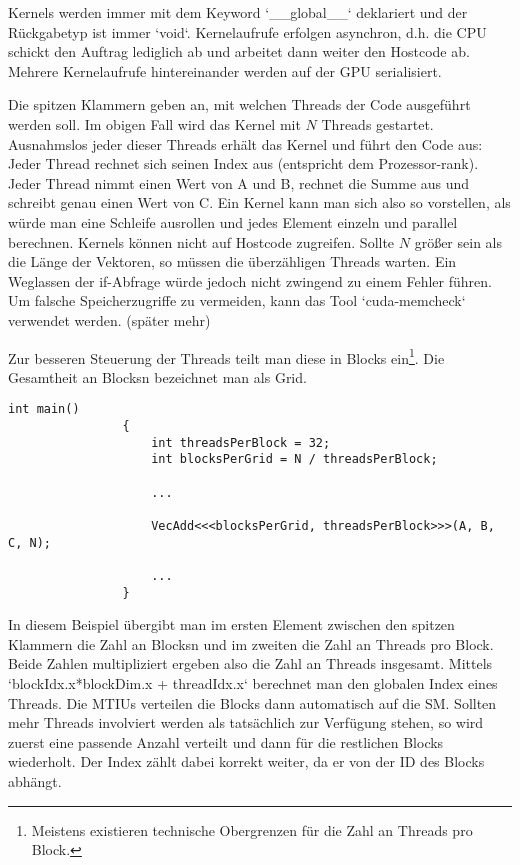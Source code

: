 			\Glspl{Kernel} werden immer mit dem Keyword \li`__global__` deklariert und der Rückgabetyp ist immer \li`void`. \Gls{Kernel}aufrufe erfolgen asynchron, d.h. die CPU schickt den Auftrag lediglich ab und arbeitet dann weiter den Hostcode ab. Mehrere \Gls{Kernel}aufrufe hintereinander werden auf der GPU serialisiert.
			
			Die spitzen Klammern geben an, mit welchen \Glspl{Thread} der Code ausgeführt werden soll. Im obigen Fall wird das \Gls{Kernel} mit $N$ \Glspl{Thread} gestartet. Ausnahmslos jeder dieser \Glspl{Thread} erhält das \Gls{Kernel} und führt den Code aus: Jeder \Gls{Thread} rechnet sich seinen Index aus (entspricht dem Prozessor-rank). Jeder \Gls{Thread} nimmt einen Wert von A und B, rechnet die Summe aus und schreibt genau einen Wert von C. Ein \Gls{Kernel} kann man sich also so vorstellen, als würde man eine Schleife ausrollen und jedes Element einzeln und parallel berechnen. \Glspl{Kernel} können nicht auf Hostcode zugreifen. Sollte $N$ größer sein als die Länge der Vektoren, so müssen die überzähligen \Glspl{Thread} warten. Ein Weglassen der if-Abfrage würde jedoch nicht zwingend zu einem Fehler führen. Um falsche Speicherzugriffe zu vermeiden, kann das Tool \li`cuda-memcheck` verwendet werden. (später mehr)
			
			Zur besseren Steuerung der \Glspl{Thread} teilt man diese in \Glspl{Block} ein\footnote{Meistens existieren technische Obergrenzen für die Zahl an Threads pro Block.}. Die Gesamtheit an \Glspl{Block}n bezeichnet man als \Gls{Grid}.
			
			\begin{lstlisting}[caption=~Kernelaufruf]		
				int main()
				{
					int threadsPerBlock = 32;
					int blocksPerGrid = N / threadsPerBlock;
					
					...
					
					VecAdd<<<blocksPerGrid, threadsPerBlock>>>(A, B, C, N);
					
					...					
				}
			\end{lstlisting}

			In diesem Beispiel übergibt man im ersten Element zwischen den spitzen Klammern die Zahl an \Glspl{Block}n und im zweiten die Zahl an \Glspl{Thread} pro \Gls{Block}. Beide Zahlen multipliziert ergeben also die Zahl an \Glspl{Thread} insgesamt. Mittels \li`blockIdx.x*blockDim.x + threadIdx.x` berechnet man den globalen Index eines \Glspl{Thread}. Die \Glspl{MTIU} verteilen die \Glspl{Block} dann automatisch auf die \Gls{SM}. Sollten mehr \Glspl{Thread} involviert werden als tatsächlich zur Verfügung stehen, so wird zuerst eine passende Anzahl verteilt und dann für die restlichen \Glspl{Block} wiederholt. Der Index zählt dabei korrekt weiter, da er von der ID des \Gls{Block}s abhängt.
			
